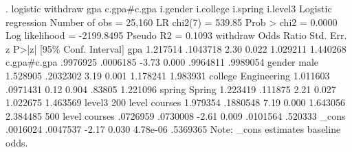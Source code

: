 . logistic withdraw gpa c.gpa\#c.gpa i.gender i.college i.spring i.level3
{\smallskip}
Logistic regression                             Number of obs     =     25,160
                                                LR chi2(7)        =     539.85
                                                Prob > chi2       =     0.0000
Log likelihood = -2199.8495                     Pseudo R2         =     0.1093
{\smallskip}
          withdraw {\VBAR} Odds Ratio   Std. Err.      z    P>|z|     [95\% Conf. Interval]
               gpa {\VBAR}   1.217514   .1043718     2.30   0.022     1.029211    1.440268
                   {\VBAR}
       c.gpa\#c.gpa {\VBAR}   .9976925   .0006185    -3.73   0.000     .9964811    .9989054
                   {\VBAR}
            gender {\VBAR}
             male  {\VBAR}   1.528905   .2032302     3.19   0.001     1.178241    1.983931
                   {\VBAR}
           college {\VBAR}
      Engineering  {\VBAR}   1.011603   .0971431     0.12   0.904       .83805    1.221096
                   {\VBAR}
            spring {\VBAR}
           Spring  {\VBAR}   1.223419    .111875     2.21   0.027     1.022675    1.463569
                   {\VBAR}
            level3 {\VBAR}
200 level courses  {\VBAR}   1.979354   .1880548     7.19   0.000     1.643056    2.384485
500 level courses  {\VBAR}   .0726959   .0730008    -2.61   0.009     .0101564     .520333
                   {\VBAR}
             _cons {\VBAR}   .0016024   .0047537    -2.17   0.030     4.78e-06    .5369365
Note: _cons estimates baseline odds.
{\smallskip}
